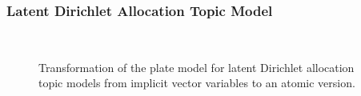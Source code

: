 \subsubsection{Latent Dirichlet Allocation Topic Model}

\begin{figure}[t]
\begin{minipage}[t]{0.49\linewidth}
	\begin{center}
	\end{center}
\end{minipage}
\hspace{0.0cm}
\begin{minipage}[t]{0.49\linewidth}
	\begin{center}
	\end{center}
\end{minipage}\\
\caption{Transformation of the plate model for latent Dirichlet allocation topic models from implicit vector variables to an atomic version.}
\label{img:topic_platemodels}
\end{figure}
